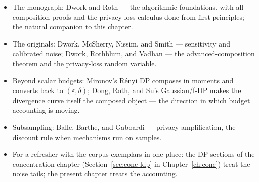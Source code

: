 \begin{itemize}
\item The monograph: Dwork and Roth \citep{dp-composition-bg3} --- the algorithmic
  foundations, with all composition proofs and the privacy-loss calculus done from
  first principles; the natural companion to this chapter.
\item The originals: Dwork, McSherry, Nissim, and Smith \citep{dp-composition-bg1} ---
  sensitivity and calibrated noise; Dwork, Rothblum, and Vadhan
  \citep{dp-composition-bg2} --- the advanced-composition theorem and the
  privacy-loss random variable.
\item Beyond scalar budgets: Mironov's R\'enyi DP \citep{dp-composition-bg4} composes in
  moments and converts back to $(\varepsilon,\delta)$; Dong, Roth, and Su's Gaussian/f-DP
  \citep{dp-composition-bg5} makes the divergence curve itself the composed object ---
  the direction in which budget accounting is moving.
\item Subsampling: Balle, Barthe, and Gaboardi \citep{dp-composition-bg6} --- privacy
  amplification, the discount rule when mechanisms run on samples.
\item For a refresher with the corpus exemplars in one place: the DP sections of the
  concentration chapter (Section~\ref{sec:conc-ldp} in Chapter~\ref{ch:conc}) treat the
  noise tails; the present chapter treats the accounting.
\end{itemize}

